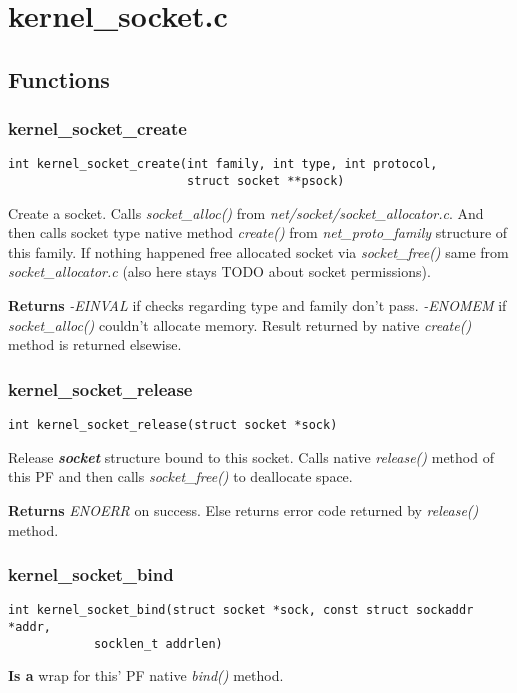 \documentclass[12pt,a4paper]{article}
\begin{document}
\newpage
\section{kernel\_socket.c}
\label{sec:kernel_socket_kernel_socket.c}

\subsection{Functions}
\label{sec:kernel_socket_kernel_socket_functions}

\subsubsection{kernel\_socket\_create}
\label{sec:kernel_socket_kernel_socket_create}
\begin{verbatim}
int kernel_socket_create(int family, int type, int protocol,
                         struct socket **psock)
\end{verbatim}
Create a socket. Calls {\it socket\_alloc()} from
{\it net/socket/socket\_allocator.c}. And then calls socket type native method
{\it create()} from {\it net\_proto\_family} structure of this family. If
nothing happened free allocated socket via {\it socket\_free()} same from
{\it socket\_allocator.c} (also here stays TODO about socket permissions).

{\bf Returns} {\it -EINVAL} if checks regarding type and family don't pass.
{\it -ENOMEM} if {\it socket\_alloc()} couldn't allocate memory. Result returned
by native {\it create()} method is returned elsewise.

\subsubsection{kernel\_socket\_release}
\label{sec:kernel_socket_kernel_socket_release}
\begin{verbatim}
int kernel_socket_release(struct socket *sock)
\end{verbatim}
Release {\it {\bf socket}} structure bound to this socket. Calls native
{\it release()} method of this PF and then calls {\it socket\_free()} to
deallocate space.

{\bf Returns} {\it ENOERR} on success. Else returns error code returned by
{\it release()} method.

\subsubsection{kernel\_socket\_bind}
\label{sec:kernel_socket_kernel_socket_bind}
\begin{verbatim}
int kernel_socket_bind(struct socket *sock, const struct sockaddr *addr,
			socklen_t addrlen)
\end{verbatim}
{\bf Is a} wrap for this' PF native {\it bind()} method.
\end{document}
